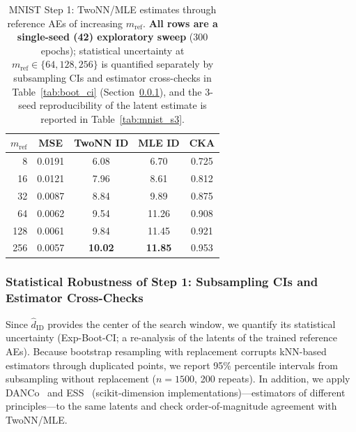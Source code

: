 \documentclass[make,article,submit,pdftex,moreauthors]{Definitions/mdpi}
\newcommand{\hatdID}{\hat{d}_{\mathrm{ID}}}
\begin{document}
\begin{table}[H]
\caption{MNIST Step 1: TwoNN/MLE estimates through reference AEs of
increasing $m_{\mathrm{ref}}$. \textbf{All rows are a single-seed (42)
exploratory sweep} (300 epochs); statistical uncertainty at
$m_{\mathrm{ref}} \in \{64, 128, 256\}$ is quantified separately by
subsampling CIs and estimator cross-checks in Table~\ref{tab:boot_ci}
(Section~\ref{sec:exp_mnist_ci}), and the 3-seed reproducibility of the
latent estimate is reported in Table~\ref{tab:mnist_s3}.}
\label{tab:mnist_s1}
\small
\begin{tabular}{rcccc}
\toprule
$m_{\mathrm{ref}}$ & \textbf{MSE} & \textbf{TwoNN ID} & \textbf{MLE ID} & \textbf{CKA} \\
\midrule
8   & 0.0191 & 6.08 & 6.70 & 0.725 \\
16  & 0.0121 & 7.96 & 8.61 & 0.812 \\
32  & 0.0087 & 8.84 & 9.89 & 0.875 \\
64  & 0.0062 & 9.54 & 11.26 & 0.908 \\
128 & 0.0061 & 9.84 & 11.45 & 0.921 \\
256 & 0.0057 & \textbf{10.02} & \textbf{11.85} & 0.953 \\
\bottomrule
\end{tabular}
\end{table}

\subsubsection{Statistical Robustness of Step 1: Subsampling CIs and Estimator Cross-Checks}
\label{sec:exp_mnist_ci}

Since $\hatdID$ provides the center of the search window, we quantify its
statistical uncertainty (Exp-Boot-CI; a re-analysis of the latents of the
trained reference AEs).
Because bootstrap resampling with replacement corrupts kNN-based estimators
through duplicated points, we report 95\% percentile intervals from
subsampling without replacement ($n = 1500$, 200 repeats).
In addition, we apply DANCo~\cite{ceruti2014danco} and
ESS~\cite{johnsson2015ess} (scikit-dimension implementations)---estimators
of different principles---to the same latents and check order-of-magnitude
agreement with TwoNN/MLE.
\end{document}
